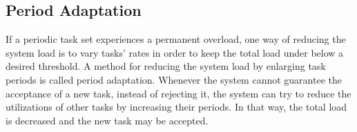 



\newpage
\subsection{Period Adaptation}
If a periodic task set experiences a permanent overload, one way of reducing the system load is to vary tasks' rates in order to keep the total load under below a desired threshold.
A method for reducing the system load by enlarging task periods is called period adaptation. 
Whenever the system cannot guarantee the acceptance of a new task, instead of rejecting it, the system can try to reduce the utilizations of other tasks by increasing their periods. In that way, the total load is decreased and the new task may be accepted.

